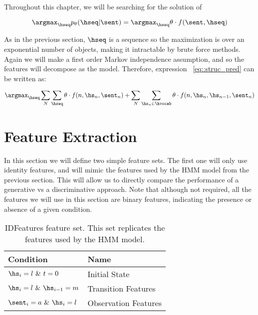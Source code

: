 Throughout this chapter, we will be searching for the solution of 

\begin{equation}
\argmax_{\hseq} p_{\theta} (\hseq | \sent ) = \argmax_{\hseq} \theta \cdot  f(\sent,\hseq) \label{eq::struc_pred} 
\end{equation}

As in the previous section, $\hseq$ is a sequence so the maximization
is over an exponential number of objects, making it intractable by brute force methods. Again
we will make a first order Markov independence assumption, and so the
features will decompose as the model. Therefore, expression
~\ref{eq::struc_pred} can be written as:

\begin{equation}
\argmax_{\hseq} \sum_N \sum_{\hseq} \theta \cdot
f(n,\hs_n,\sent_n)  + \sum_N \sum_{\hs_n \in \hvocab} \theta \cdot f(n,\hs_n,\hs_{n-1},\sent_n)\label{eq::struc_pred_decompose} 
\end{equation}

\section{\label{seq::features} Feature Extraction}

In this section we will define two simple feature sets. The first one
will only use identity features, and will mimic the features used by
the HMM model from the previous section. This will allow us to directly
compare the performance of a generative vs a discriminative
approach. Note that although not required, all the features we will use
in this section are binary features, indicating the presence or
absence of a given condition. 

\begin{table}
\begin{center}
\begin{tabular}{|l|l|}
\hline
Condition & Name\\
\hline
$\hs_i = l \text{  } \& \text{  } t =0 $& Initial State \\
\hline
$\hs_i = l \text{  } \& \text{  } \hs_{i-1} = m$& Transition Features \\
\hline
$\sent_i = a \text{  } \& \text{  } \hs_i = l$& Observation Features \\
\hline
\end{tabular}
\caption{\label{id-features} IDFeatures feature set. This set
  replicates the features used by the HMM model.}
\end{center}
\end{table}

